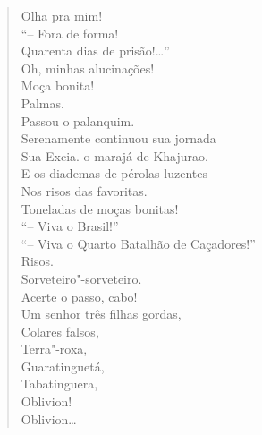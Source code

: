 {\begin{verse}
Olha pra mim!\\
``-- Fora de forma!\\
Quarenta dias de prisão!\ldots{}''\\
\qquad\qquad\qquad\quad Oh, minhas alucinações!\\
Moça bonita!\\
Palmas.\\
Passou o palanquim.\\
Serenamente continuou sua jornada\\
Sua Excia. o marajá de Khajurao.\\
E os diademas de pérolas luzentes\\
Nos risos das favoritas.\\
Toneladas de moças bonitas!\\
\qquad\quad ``-- Viva o Brasil!''\\
\qquad\qquad\quad ``-- Viva o Quarto Batalhão de Caçadores!''\\
Risos.\\
Sorveteiro"-sorveteiro.\\
Acerte o passo, cabo!\\
Um senhor três filhas gordas,\\
\qquad\qquad\qquad\quad Colares falsos,\\
\qquad\qquad\qquad Terra"-roxa,\\
\qquad\qquad\quad Guaratinguetá,\\
\qquad\qquad Tabatinguera,\\
\qquad\quad Oblivion!\\
\qquad Oblivion\ldots{}


\end{verse}}
